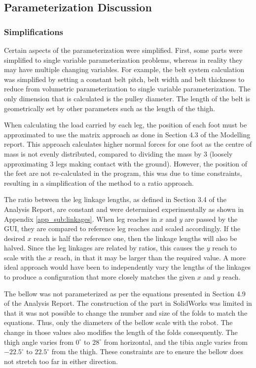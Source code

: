\subsection{Parameterization Discussion} \label{sub_sec:param_discussion}


\subsubsection{Simplifications}

Certain aspects of the parameterization were simplified.
First, some parts were simplified to single variable parameterization problems, whereas in reality they may have multiple changing variables.
For example, the belt system calculation was simplified by setting a constant belt pitch, belt width and belt thickness to reduce from volumetric parameterization to single variable parameterization. The only dimension that is calculated is the pulley diameter. The length of the belt is geometrically set by other parameters such as the length of the thigh.

When calculating the load carried by each leg, the position of each foot must be approximated to use the matrix approach as done in Section 4.3 of the Modelling report. This approach calculates higher normal forces for one foot as the centre of mass is not evenly distributed, compared to dividing the mass by 3 (loosely approximating 3 legs making contact with the ground).
However, the position of the feet are not re-calculated in the program, this was due to time constraints, resulting in a simplification of the method to a ratio approach.

The ratio between the leg linkage lengths, as defined in Section 3.4 of the Analysis Report, are constant and were determined experimentally as shown in Appendix \ref{app_sub:linkages}. When leg reaches in $x$ and $y$ are passed by the GUI, they are compared to reference leg reaches and scaled accordingly. If the desired $x$ reach is half the reference one, then the linkage lengths will also be halved. Since the leg linkages are related by ratios, this causes the $y$ reach to scale with the $x$ reach, in that it may be larger than the required value. A more ideal approach would have been to independently vary the lengths of the linkages to produce a configuration that more closely matches the given $x$ and $y$ reach.

The bellow was not parameterized as per the equations presented in Section 4.9 of the Analysis Report. The construction of the part in SolidWorks was limited in that it was not possible to change the number and size of the folds to match the equations. Thus, only the diameters of the bellow scale with the robot. The change in those values also modifies the length of the folds consequently.
The thigh angle varies from $0^{\circ}$ to $28^{\circ}$ from horizontal, and the tibia angle varies from $-22.5^{\circ}$ to $22.5^{\circ}$ from the thigh.
These constraints are to ensure the bellow does not stretch too far in either direction.

